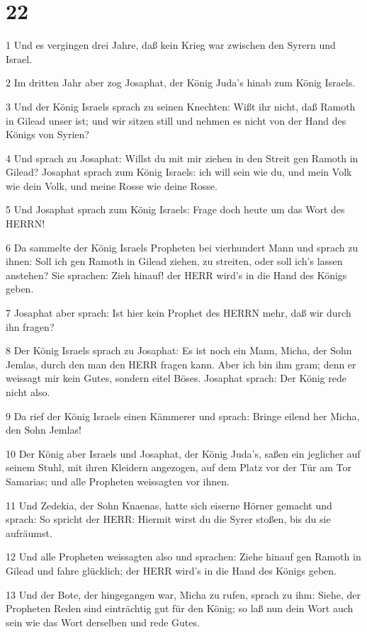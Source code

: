 \chapter{22}

\par 1 Und es vergingen drei Jahre, daß kein Krieg war zwischen den Syrern und Israel.
\par 2 Im dritten Jahr aber zog Josaphat, der König Juda's hinab zum König Israels.
\par 3 Und der König Israels sprach zu seinen Knechten: Wißt ihr nicht, daß Ramoth in Gilead unser ist; und wir sitzen still und nehmen es nicht von der Hand des Königs von Syrien?
\par 4 Und sprach zu Josaphat: Willst du mit mir ziehen in den Streit gen Ramoth in Gilead? Josaphat sprach zum König Israels: ich will sein wie du, und mein Volk wie dein Volk, und meine Rosse wie deine Rosse.
\par 5 Und Josaphat sprach zum König Israels: Frage doch heute um das Wort des HERRN!
\par 6 Da sammelte der König Israels Propheten bei vierhundert Mann und sprach zu ihnen: Soll ich gen Ramoth in Gilead ziehen, zu streiten, oder soll ich's lassen anstehen? Sie sprachen: Zieh hinauf! der HERR wird's in die Hand des Königs geben.
\par 7 Josaphat aber sprach: Ist hier kein Prophet des HERRN mehr, daß wir durch ihn fragen?
\par 8 Der König Israels sprach zu Josaphat: Es ist noch ein Mann, Micha, der Sohn Jemlas, durch den man den HERR fragen kann. Aber ich bin ihm gram; denn er weissagt mir kein Gutes, sondern eitel Böses. Josaphat sprach: Der König rede nicht also.
\par 9 Da rief der König Israels einen Kämmerer und sprach: Bringe eilend her Micha, den Sohn Jemlas!
\par 10 Der König aber Israels und Josaphat, der König Juda's, saßen ein jeglicher auf seinem Stuhl, mit ihren Kleidern angezogen, auf dem Platz vor der Tür am Tor Samarias; und alle Propheten weissagten vor ihnen.
\par 11 Und Zedekia, der Sohn Knaenas, hatte sich eiserne Hörner gemacht und sprach: So spricht der HERR: Hiermit wirst du die Syrer stoßen, bis du sie aufräumst.
\par 12 Und alle Propheten weissagten also und sprachen: Ziehe hinauf gen Ramoth in Gilead und fahre glücklich; der HERR wird's in die Hand des Königs geben.
\par 13 Und der Bote, der hingegangen war, Micha zu rufen, sprach zu ihm: Siehe, der Propheten Reden sind einträchtig gut für den König; so laß nun dein Wort auch sein wie das Wort derselben und rede Gutes.
